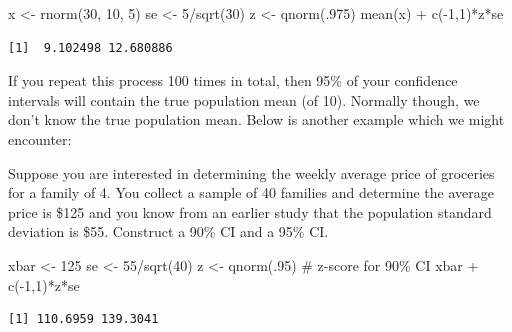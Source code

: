 \documentclass[
  letterpaper,
  DIV=11,
  numbers=noendperiod]{scrreprt}
\newenvironment{Shaded}{\begin{snugshade}}{\end{snugshade}}
\newcommand{\CommentTok}[1]{\textcolor[rgb]{0.37,0.37,0.37}{#1}}
\newcommand{\DecValTok}[1]{\textcolor[rgb]{0.68,0.00,0.00}{#1}}
\newcommand{\FunctionTok}[1]{\textcolor[rgb]{0.28,0.35,0.67}{#1}}
\newcommand{\NormalTok}[1]{\textcolor[rgb]{0.00,0.23,0.31}{#1}}
\newcommand{\OtherTok}[1]{\textcolor[rgb]{0.00,0.23,0.31}{#1}}
\newcommand{\SpecialCharTok}[1]{\textcolor[rgb]{0.37,0.37,0.37}{#1}}
\begin{document}
\begin{Shaded}
\begin{Highlighting}[]
\NormalTok{x }\OtherTok{\textless{}{-}} \FunctionTok{rnorm}\NormalTok{(}\DecValTok{30}\NormalTok{, }\DecValTok{10}\NormalTok{, }\DecValTok{5}\NormalTok{)}
\NormalTok{se }\OtherTok{\textless{}{-}} \DecValTok{5}\SpecialCharTok{/}\FunctionTok{sqrt}\NormalTok{(}\DecValTok{30}\NormalTok{)}
\NormalTok{z }\OtherTok{\textless{}{-}} \FunctionTok{qnorm}\NormalTok{(.}\DecValTok{975}\NormalTok{)}
\FunctionTok{mean}\NormalTok{(x) }\SpecialCharTok{+} \FunctionTok{c}\NormalTok{(}\SpecialCharTok{{-}}\DecValTok{1}\NormalTok{,}\DecValTok{1}\NormalTok{)}\SpecialCharTok{*}\NormalTok{z}\SpecialCharTok{*}\NormalTok{se}
\end{Highlighting}
\end{Shaded}

\begin{verbatim}
[1]  9.102498 12.680886
\end{verbatim}

If you repeat this process 100 times in total, then 95\% of your
confidence intervals will contain the true population mean (of 10).
Normally though, we don't know the true population mean. Below is
another example which we might encounter:

Suppose you are interested in determining the weekly average price of
groceries for a family of 4. You collect a sample of 40 families and
determine the average price is \$125 and you know from an earlier study
that the population standard deviation is \$55. Construct a 90\% CI and
a 95\% CI.

\begin{Shaded}
\begin{Highlighting}[]
\NormalTok{xbar }\OtherTok{\textless{}{-}} \DecValTok{125}
\NormalTok{se }\OtherTok{\textless{}{-}} \DecValTok{55}\SpecialCharTok{/}\FunctionTok{sqrt}\NormalTok{(}\DecValTok{40}\NormalTok{)}
\NormalTok{z }\OtherTok{\textless{}{-}} \FunctionTok{qnorm}\NormalTok{(.}\DecValTok{95}\NormalTok{) }\CommentTok{\# z{-}score for 90\% CI}
\NormalTok{xbar }\SpecialCharTok{+} \FunctionTok{c}\NormalTok{(}\SpecialCharTok{{-}}\DecValTok{1}\NormalTok{,}\DecValTok{1}\NormalTok{)}\SpecialCharTok{*}\NormalTok{z}\SpecialCharTok{*}\NormalTok{se}
\end{Highlighting}
\end{Shaded}

\begin{verbatim}
[1] 110.6959 139.3041
\end{verbatim}
\end{document}
